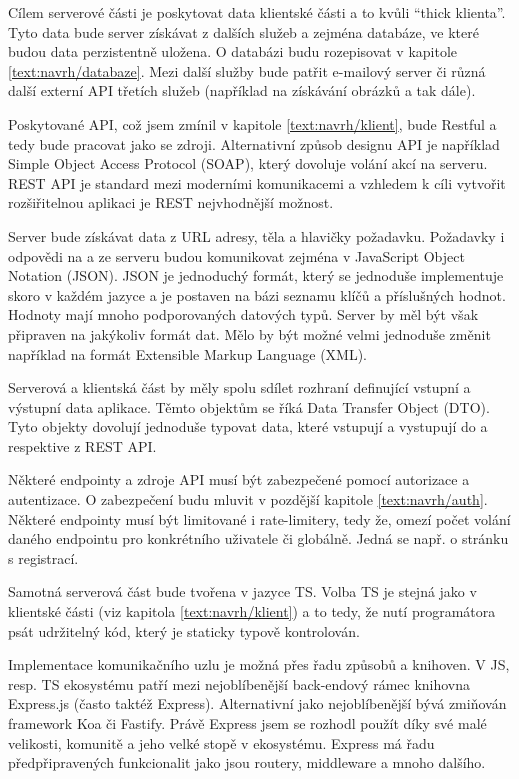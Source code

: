 Cílem serverové části je poskytovat data klientské části a to kvůli \enquote{thick klienta}. 
Tyto data bude server získávat z dalších služeb a zejména databáze, ve které budou data perzistentně uložena.
O databázi budu rozepisovat v kapitole \ref{text:navrh/databaze}.
Mezi další služby bude patřit e-mailový server či různá další externí API třetích služeb (například na získávání obrázků a tak dále).

Poskytované API, což jsem zmínil v kapitole \ref{text:navrh/klient}, bude Restful a tedy bude pracovat jako se zdroji. 
Alternativní způsob designu API je například Simple Object Access Protocol (SOAP), který dovoluje volání akcí na serveru.
REST API je standard mezi moderními komunikacemi a vzhledem k cíli vytvořit rozšiřitelnou aplikaci je REST nejvhodnější možnost.

Server bude získávat data z URL adresy, těla a hlavičky požadavku.
Požadavky i odpovědi na a ze serveru budou komunikovat zejména v JavaScript Object Notation (JSON).
JSON je jednoduchý formát, který se jednoduše implementuje skoro v každém jazyce a je postaven na bázi seznamu klíčů a příslušných hodnot.
Hodnoty mají mnoho podporovaných datových typů.
Server by měl být však připraven na jakýkoliv formát dat.
Mělo by být možné velmi jednoduše změnit například na formát Extensible Markup Language (XML).

Serverová a klientská část by měly spolu sdílet rozhraní definující vstupní a výstupní data aplikace.
Těmto objektům se říká Data Transfer Object (DTO).
Tyto objekty dovolují jednoduše typovat data, které vstupují a vystupují do a respektive z REST API.

Některé endpointy a zdroje API musí být zabezpečené pomocí autorizace a autentizace. 
O zabezpečení budu mluvit v pozdější kapitole \ref{text:navrh/auth}.
Některé endpointy musí být limitované i rate-limitery, tedy že, omezí počet volání daného endpointu pro konkrétního uživatele či globálně.
Jedná se např. o stránku s registrací.

Samotná serverová část bude tvořena v jazyce TS.
Volba TS je stejná jako v klientské části (viz kapitola \ref{text:navrh/klient}) a to tedy, že nutí programátora psát udržitelný kód, který je staticky typově kontrolován.

Implementace komunikačního uzlu je možná přes řadu způsobů a knihoven.
V JS, resp. TS ekosystému patří mezi nejoblíbenější back-endový rámec knihovna Express.js (často taktéž Express).
Alternativní jako nejoblíbenější bývá zmiňován framework Koa či Fastify.
Právě Express jsem se rozhodl použít díky své malé velikosti, komunitě a jeho velké stopě v ekosystému.
Express má řadu předpřipravených funkcionalit jako jsou routery, middleware a mnoho dalšího.


